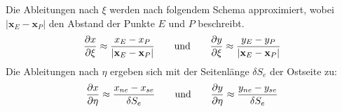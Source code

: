 Die Ableitungen nach $\xi$ werden nach folgendem Schema approximiert, wobei
$\vert \mathbf{x}_E -\mathbf{x}_P \vert$ den Abstand der Punkte $E$ und $P$ beschreibt.
\begin{equation}
  \pder[x]{\xi} \approx \frac{x_E-x_P}{\vert \mathbf{x}_E -\mathbf{x}_P \vert} \qquad
  \text{und} \qquad \pder[y]{\xi} \approx \frac{y_E-y_P}{\vert \mathbf{x}_E -\mathbf{x}_P \vert}
\end{equation}
Die Ableitungen nach $\eta$ ergeben sich mit der Seitenlänge $\delta S_e$ der Ostseite
zu:
\begin{equation}
  \pder[x]{\eta} \approx \frac{x_{ne}-x_{se}}{\delta S_e} \qquad
  \text{und} \qquad \pder[y]{\eta} \approx \frac{y_{ne}-y_{se}}{\delta S_e}
\end{equation}
